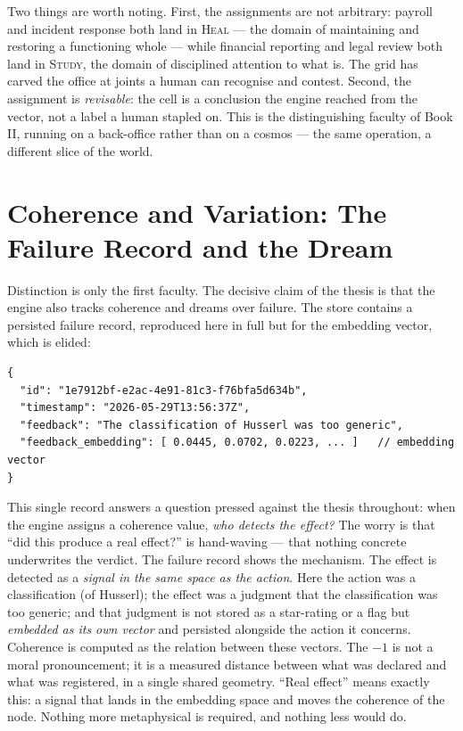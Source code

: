 Two things are worth noting. First, the assignments are not arbitrary: payroll and
incident response both land in \textsc{Heal} --- the domain of maintaining and
restoring a functioning whole --- while financial reporting and legal review both
land in \textsc{Study}, the domain of disciplined attention to what is. The grid
has carved the office at joints a human can recognise and contest. Second, the
assignment is \emph{revisable}: the cell is a conclusion the engine reached from
the vector, not a label a human stapled on. This is the distinguishing faculty of
Book II, running on a back-office rather than on a cosmos --- the same operation,
a different slice of the world.

\section{Coherence and Variation: The Failure Record and the Dream}

Distinction is only the first faculty. The decisive claim of the thesis is that
the engine also tracks coherence and dreams over failure. The store contains a
persisted failure record, reproduced here in full but for the embedding
vector, which is elided:

\begin{lstlisting}
{
  "id": "1e7912bf-e2ac-4e91-81c3-f76bfa5d634b",
  "timestamp": "2026-05-29T13:56:37Z",
  "feedback": "The classification of Husserl was too generic",
  "feedback_embedding": [ 0.0445, 0.0702, 0.0223, ... ]   // embedding vector
}
\end{lstlisting}

This single record answers a question pressed against the thesis throughout: when
the engine assigns a coherence value, \emph{who detects the effect?} The worry is
that ``did this produce a real effect?'' is hand-waving --- that nothing concrete
underwrites the verdict. The failure record shows the mechanism. The effect is
detected as a \emph{signal in the same space as the action}. Here the action was a
classification (of Husserl); the effect was a judgment that the classification was
too generic; and that judgment is not stored as a star-rating or a flag but
\emph{embedded as its own vector} and persisted alongside the
action it concerns. Coherence is computed as the relation between these vectors.
The $-1$ is not a moral pronouncement; it is a measured distance between what was
declared and what was registered, in a single shared geometry. ``Real effect''
means exactly this: a signal that lands in the embedding space and moves the
coherence of the node. Nothing more metaphysical is required, and nothing less
would do.

